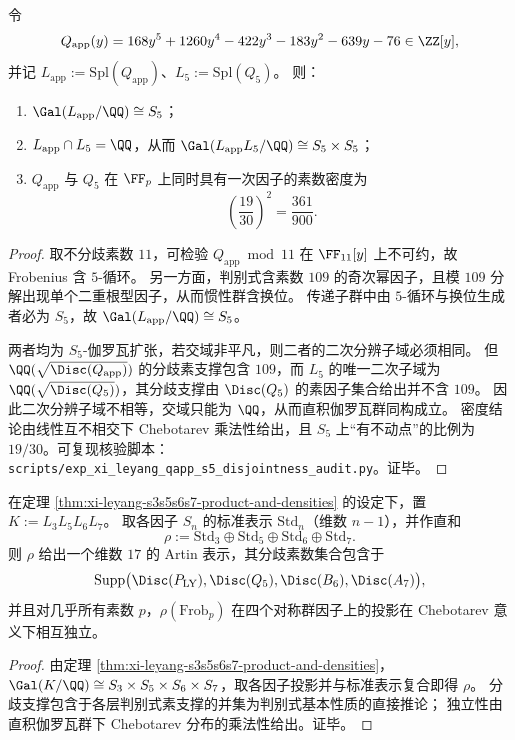 \begin{theorem}\label{thm:xi-leyang-qapp-s5-disjoint-from-q5}
令
\[
Q_{\mathrm{app}}(y)=168y^5+1260y^4-422y^3-183y^2-639y-76\in\ZZ[y],
\]
并记 \(L_{\mathrm{app}}:=\mathrm{Spl}(Q_{\mathrm{app}})\)、\(L_5:=\mathrm{Spl}(Q_5)\)。
则：
\begin{enumerate}
  \item \(\Gal(L_{\mathrm{app}}/\QQ)\cong S_5\)；
  \item \(L_{\mathrm{app}}\cap L_5=\QQ\)，从而 \(\Gal(L_{\mathrm{app}}L_5/\QQ)\cong S_5\times S_5\)；
  \item \(Q_{\mathrm{app}}\) 与 \(Q_5\) 在 \(\FF_p\) 上同时具有一次因子的素数密度为
  \[
  \left(\frac{19}{30}\right)^2=\frac{361}{900}.
  \]
\end{enumerate}
\end{theorem}
\begin{proof}
取不分歧素数 \(11\)，可检验 \(Q_{\mathrm{app}}\bmod 11\) 在 \(\FF_{11}[y]\) 上不可约，故 Frobenius 含 \(5\)-循环。
另一方面，判别式含素数 \(109\) 的奇次幂因子，且模 \(109\) 分解出现单个二重根型因子，从而惯性群含换位。
传递子群中由 \(5\)-循环与换位生成者必为 \(S_5\)，故 \(\Gal(L_{\mathrm{app}}/\QQ)\cong S_5\)。
\par
两者均为 \(S_5\)-伽罗瓦扩张，若交域非平凡，则二者的二次分辨子域必须相同。
但 \(\QQ(\sqrt{\Disc(Q_{\mathrm{app}})})\) 的分歧素支撑包含 \(109\)，而 \(L_5\) 的唯一二次子域为 \(\QQ(\sqrt{\Disc(Q_5)})\)，其分歧支撑由 \(\Disc(Q_5)\) 的素因子集合给出并不含 \(109\)。
因此二次分辨子域不相等，交域只能为 \(\QQ\)，从而直积伽罗瓦群同构成立。
密度结论由线性互不相交下 Chebotarev 乘法性给出，且 \(S_5\) 上“有不动点”的比例为 \(19/30\)。可复现核验脚本：\texttt{scripts/exp\_xi\_leyang\_qapp\_s5\_disjointness\_audit.py}。证毕。
\end{proof}

\begin{corollary}\label{cor:xi-leyang-artin-family-s3s5s6s7}
在定理 \ref{thm:xi-leyang-s3s5s6s7-product-and-densities} 的设定下，置 \(K:=L_3L_5L_6L_7\)。
取各因子 \(S_n\) 的标准表示 \(\mathrm{Std}_n\)（维数 \(n-1\)），并作直和
\[
\rho:=\mathrm{Std}_3\oplus \mathrm{Std}_5\oplus \mathrm{Std}_6\oplus \mathrm{Std}_7.
\]
则 \(\rho\) 给出一个维数 \(17\) 的 Artin 表示，其分歧素数集合包含于
\[
\mathrm{Supp}\bigl(\Disc(P_{\mathrm{LY}}),\Disc(Q_5),\Disc(B_6),\Disc(A_7)\bigr),
\]
并且对几乎所有素数 \(p\)，\(\rho(\mathrm{Frob}_p)\) 在四个对称群因子上的投影在 Chebotarev 意义下相互独立。
\end{corollary}
\begin{proof}
由定理 \ref{thm:xi-leyang-s3s5s6s7-product-and-densities}，\(\Gal(K/\QQ)\cong S_3\times S_5\times S_6\times S_7\)，取各因子投影并与标准表示复合即得 \(\rho\)。
分歧支撑包含于各层判别式素支撑的并集为判别式基本性质的直接推论；
独立性由直积伽罗瓦群下 Chebotarev 分布的乘法性给出。证毕。
\end{proof}

\endinput
